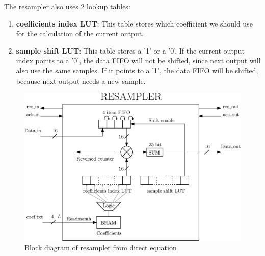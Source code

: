 \documentclass[a4paper,twoside,11pt, fleqn]{article}
\begin{document}
The resampler also uses 2 lookup tables:
\begin{enumerate}
\item \textbf{coefficients index LUT}: This table stores which coefficient we should use for the calculation of the current output.
\item \textbf{sample shift LUT}: This table stores a '1' or a '0'. If the current output index points to a '0', the data FIFO will not be shifted, since next output will also use the same samples. If it points to a '1', the data FIFO  will be shifted, because next output needs a new sample.
\end{enumerate}

\begin{figure}[h]
	\includegraphics[scale = 1]{Images/4_blockdiagram}
    \caption{Block diagram of resampler from direct equation}
\end{figure}
\end{document}
